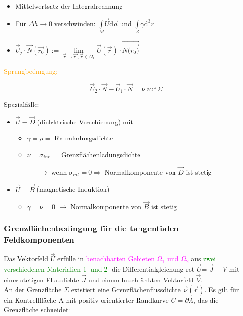 \documentclass[]{article}
\newcommand{\dd}{\ensuremath{\text{d}}}
\begin{document}
	\begin{itemize}
		\item 
			Mittelwertsatz der Integralrechnung
		\item 	
			Für $\Delta h \rightarrow 0$ verschwinden: $\int\limits_{M}\vec{U}\dd \vec{a}$ und $\int\limits_{Z}\gamma \dd^3 r$
		\item 
			$\vec{U}_j\cdot \vec{N}(\vec{r_0}):=\lim\limits_{\vec{r}\rightarrow\vec{r_0}; \vec{r}\in \Omega_1} \vec{U}(\vec{r})\cdot \vec{N(\vec{r_0)}}$
	\end{itemize}
	
	\textcolor{orange}{Sprungbedingung:}
	
	\begin{center}
		\begin{boxedminipage}[orange]{6cm}
			\begin{displaymath}
				\vec{U}_2\cdot \vec{N}-\vec{U}_1\cdot \vec{N}=\nu \ \text{auf} \ \Sigma
			\end{displaymath} 
		\end{boxedminipage}
	\end{center}

\newpage

 Spezialfälle:

	\begin{itemize}
		\item 
			$\vec{U}=\vec{D}$ (dielektrische Verschiebung) mit 
			\begin{itemize}
				\item 
					$\gamma=\rho=$ Raumladungsdichte
				\item 
					$\nu=\sigma_{int}=$ Grenzflächenladungsdichte
					\begin{itemize}
						\item[$\rightarrow$]
							wenn $\sigma_{int}=0 \Rightarrow $ Normalkomponente von $\vec{D} $ ist stetig
					\end{itemize}
			\end{itemize}
		\item 
			$\vec{U}=\vec{B}$ (magnetische Induktion) 
			\begin{itemize}
				\item 
					$\gamma=\nu=0$ $\rightarrow$  Normalkomponente von $\vec{B}$ ist stetig 
			\end{itemize}
	\end{itemize}

\subsubsection{Grenzflächenbedingung für die tangentialen Feldkomponenten}
	Das Vektorfeld $\vec{U}$ erfülle in \textcolor{magenta}{benachbarten Gebieten $\Omega_1$ und $\Omega_2$} aus \textcolor{green}{zwei verschiedenen Materialien \textcircled{1} und \textcircled{2}} die Differentialgleichung rot $\vec{U}$= $\vec{J}+\vec{V}$ mit einer stetigen Flussdichte $\vec{J}$ und einem beschränkten Vektorfeld $\vec{V}$.
	\\An der Grenzfläche $\Sigma$ existiert eine Grenzflächenflussdichte $\vec{\nu}(\vec{r})$. Es gilt für ein Kontrollfläche A mit positiv orientierter Randkurve $C=∂A$, das die Grenzfläche schneidet: 
	
\end{document}
